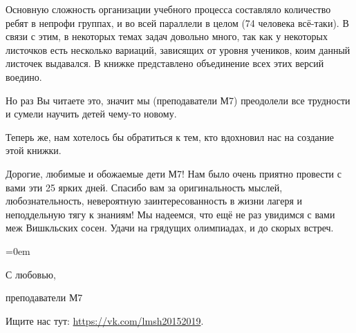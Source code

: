 \documentclass[10pt]{book}
\begin{document}
Основную сложность организации учебного процесса составляло количество ребят в непрофи группах, и во всей параллели в целом (74 человека всё-таки). В связи с этим, в некоторых темах задач довольно много, так  как у некоторых листочков есть несколько вариаций, зависящих от уровня учеников, коим данный листочек выдавался. В книжке представлено объединение всех этих версий воедино.

Но раз Вы читаете это, значит мы (преподаватели М7) преодолели все трудности и сумели научить детей чему-то новому.

Теперь же, нам хотелось бы обратиться к тем, кто вдохновил нас на создание этой книжки.

Дорогие, любимые и обожаемые дети М7! Нам было очень приятно провести с вами эти 25 ярких дней. Спасибо вам за оригинальность мыслей, любознательность, невероятную заинтересованность в жизни лагеря и неподдельную тягу к знаниям! Мы надеемся, что ещё не раз увидимся с вами меж Вишкльских сосен. Удачи на грядущих олимпиадах, и до скорых встреч.

\parindent=0em


\begin{flushright}
\vspace{1cm}

С любовью,

преподаватели М7

\vfill

Ищите нас тут: \url{https://vk.com/lmsh20152019}.
\end{flushright}

\tableofcontents\newpage

\renewcommand{\@oddhead}{\vbox{\hbox to \textwidth{{\raisebox{1.8mm}{\strut{\small\bfseries Кировская ЛМШ 2016, 7 класс}}\hfil\raisebox{1.8mm}{\strut\bfseries\thepage}}}\hrule}}
\renewcommand{\@evenhead}{\vbox{\hbox to \textwidth{{\raisebox{1.8mm}{\strut\bfseries\thepage}\hfil\raisebox{1.8mm}{\strut{\small\bfseries Кировская ЛМШ 2016, 7 класс}}}}\hrule}}
\end{document}
